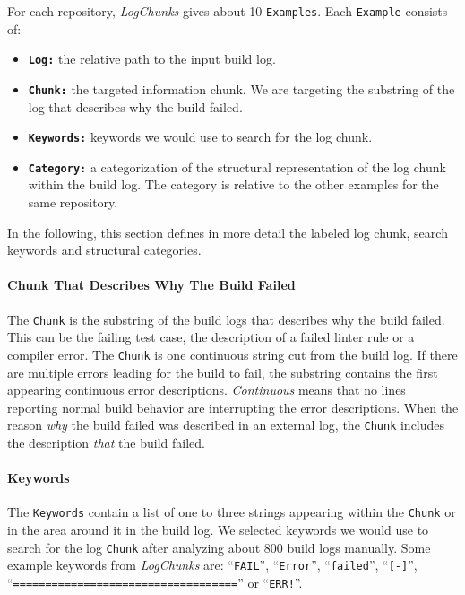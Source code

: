 \documentclass[\myrootdir/main.tex]{subfiles}
\begin{document}
For each repository, \emph{LogChunks} gives about 10 \texttt{Examples}.
Each \texttt{Example} consists of:
\begin{itemize}
	\item \textbf{\texttt{Log:}} the relative path to the input build log.
	\item \textbf{\texttt{Chunk:}} the targeted information chunk. We are targeting the substring of the log that describes why the build failed.
	\item \textbf{\texttt{Keywords:}} keywords we would use to search for the log chunk.
	\item \textbf{\texttt{Category:}} a categorization of the structural representation of the log chunk within the build log.
				The category is relative to the other examples for the same repository.
\end{itemize}
In the following, this section defines in more detail the labeled log chunk, search keywords and structural categories.

\paragraph{Chunk That Describes Why The Build Failed}
The \texttt{Chunk} is the substring of the build logs that describes why the build failed.
This can be the failing test case, the description of a failed linter rule or a compiler error.
The \texttt{Chunk} is one continuous string cut from the build log.
If there are multiple errors leading for the build to fail, the substring contains the first appearing continuous error descriptions.
\emph{Continuous} means that no lines reporting normal build behavior are interrupting the error descriptions.
When the reason \emph{why} the build failed was described in an external log, the \texttt{Chunk} includes the description \emph{that} the build failed.

\paragraph{Keywords}
The \texttt{Keywords} contain a list of one to three strings appearing within the \texttt{Chunk} or in the area around it in the build log.
We selected keywords we would use to search for the log \texttt{Chunk} after analyzing about 800 build logs manually.
Some example keywords from \emph{LogChunks} are: ``\texttt{FAIL}'', ``\texttt{Error}'', ``\texttt{failed}'', ``\texttt{[-]}'', ``\texttt{===================================}'' or ``\texttt{ERR!}''.
\end{document}
